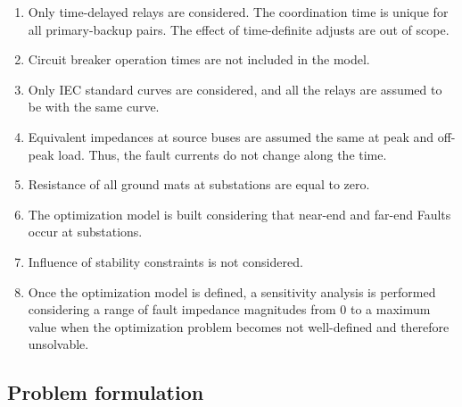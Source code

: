 \documentclass[letterpaper, 10 pt, conference]{IEEEtran}
\begin{document}
\begin{enumerate}
  \item Only time-delayed relays are considered.  The coordination time is unique for all primary-backup pairs. The effect of time-definite adjusts are out of scope.

\item Circuit breaker operation times are not included in the model.

  \item Only IEC standard curves are considered, and all the relays are assumed to be with the same curve.

  \item Equivalent impedances at source buses are assumed the same at peak and off-peak load. Thus, the fault currents do not change along the time.

\item Resistance of all ground mats at substations are equal to zero.

\item The optimization model is built considering that near-end and far-end Faults occur at substations.

\item Influence of stability constraints is not considered.

\item Once the optimization model is defined, a sensitivity analysis is performed considering a range of fault impedance magnitudes from 0 to a maximum value when the optimization problem becomes not well-defined and therefore unsolvable.
\end{enumerate}




 
 
 
\subsection{Problem formulation}
\end{document}
